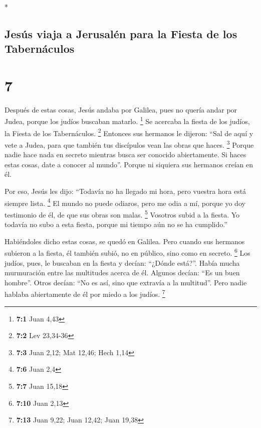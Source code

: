 \begin{paracol}{2}
\begin{otherlanguage}{english}
\end{otherlanguage}

\switchcolumn[0]*

\hypertarget{jesuxfas-viaja-a-jerusaluxe9n-para-la-fiesta-de-los-tabernuxe1culos}{%
\subsection{Jesús viaja a Jerusalén para la Fiesta de los
Tabernáculos}\label{jesuxfas-viaja-a-jerusaluxe9n-para-la-fiesta-de-los-tabernuxe1culos}}

\hypertarget{section-12}{%
\section{7}\label{section-12}}

 Después de estas cosas, Jesús andaba por Galilea, pues no
quería andar por Judea, porque los judíos buscaban matarlo. \footnote{\textbf{7:1}
  Juan 4,43}  Se acercaba la fiesta de los judíos, la
Fiesta de los Tabernáculos. \footnote{\textbf{7:2} Lev 23,34-36}
 Entonces sus hermanos le dijeron: ``Sal de aquí y vete a
Judea, para que también tus discípulos vean las obras que haces.
\footnote{\textbf{7:3} Juan 2,12; Mat 12,46; Hech 1,14} 
Porque nadie hace nada en secreto mientras busca ser conocido
abiertamente. Si haces estas cosas, date a conocer al mundo''.
 Porque ni siquiera sus hermanos creían en él.

 Por eso, Jesús les dijo: ``Todavía no ha llegado mi hora,
pero vuestra hora está siempre lista. \footnote{\textbf{7:6} Juan 2,4}
 El mundo no puede odiaros, pero me odia a mí, porque yo
doy testimonio de él, de que sus obras son malas. \footnote{\textbf{7:7}
  Juan 15,18}  Vosotros subid a la fiesta. Yo todavía no
subo a esta fiesta, porque mi tiempo aún no se ha cumplido.''

 Habiéndoles dicho estas cosas, se quedó en Galilea.
 Pero cuando sus hermanos subieron a la fiesta, él
también subió, no en público, sino como en secreto. \footnote{\textbf{7:10}
  Juan 2,13}  Los judíos, pues, le buscaban en la fiesta
y decían: ``¿Dónde está?''.  Había mucha murmuración
entre las multitudes acerca de él. Algunos decían: ``Es un buen
hombre''. Otros decían: ``No es así, sino que extravía a la multitud''.
 Pero nadie hablaba abiertamente de él por miedo a los
judíos. \footnote{\textbf{7:13} Juan 9,22; Juan 12,42; Juan 19,38}


\end{paracol}
